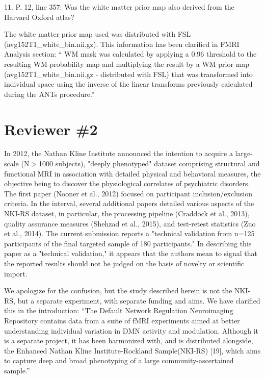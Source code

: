 \documentclass{article}
\newcommand{\RESPONSE}[1]{\textcolor{responseblue}{#1}}
\begin{document}
11. P. 12, line 357: Was the white matter prior map also derived from the Harvard Oxford atlas?

\RESPONSE{The white matter prior map used was distributed with FSL (avg152T1\_white\_bin.nii.gz). This information has been clarified in FMRI Analysis section: `` WM mask was calculated by applying a 0.96 threshold to the resulting WM probability map and multiplying the result by a WM prior map (avg152T1\_white\_bin.nii.gz - distributed with FSL) that was transformed into individual space using the inverse of the linear transforms previously calculated during the ANTs procedure.''}

\section*{Reviewer \#2}

In 2012, the Nathan Kline Institute announced the intention to acquire a large-scale (N$>$1000 subjects), "deeply phenotyped" dataset comprising structural and functional MRI in association with detailed physical and behavioral measures, the objective being to discover the physiological correlates of psychiatric disorders. The first paper (Nooner et al., 2012) focused on participant inclusion/exclusion criteria. In the interval, several additional papers detailed various aspects of the NKI-RS dataset, in particular, the processing pipeline (Craddock et al., 2013), quality assurance measures (Shehzad et al., 2015), and test-retest statistics (Zuo et al., 2014). The current submission reports a "technical validation from n=125 participants of the final targeted sample of 180 participants." In describing this paper as a "technical validation," it appears that the authors mean to signal that the reported results should not be judged on the basis of novelty or
scientific import.

\RESPONSE{We apologize for the confusion, but the study described herein is not the NKI-RS, but a separate experiment, with separate funding and aims. We have clarified this in the introduction: ``The Default Network Regulation Neuroimaging Repository contains data from a suite of fMRI experiments aimed at better understanding individual variation in DMN activity and modulation.  Although it is a separate project, it has been harmonized with, and is distributed alongside, the Enhanced Nathan Kline Institute-Rockland Sample(NKI-RS) [19], which aims to capture deep and broad phenotyping of a large community-ascertained sample.''} 
\end{document}
